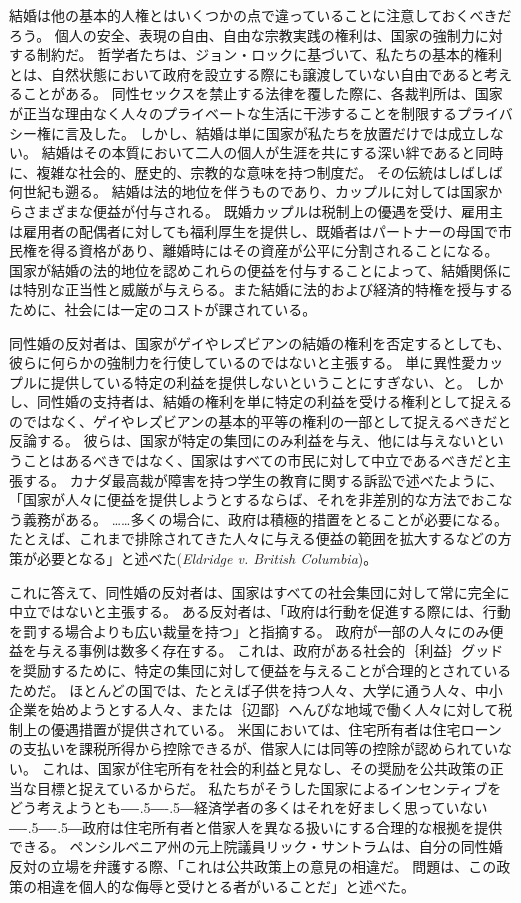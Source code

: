 \documentclass[paper=a4,book,openany]{jlreq}
\def\DDASH{―\kern-.5\zw―\kern-.5\zw―} %
\begin{document}
結婚は他の基本的人権とはいくつかの点で違っていることに注意しておくべきだろう。
個人の安全、表現の自由、自由な宗教実践の権利は、国家の強制力に対する制約だ。
哲学者たちは、ジョン・ロックに基づいて、私たちの基本的権利とは、自然状態において政府を設立する際にも譲渡していない自由であると考えることがある。
同性セックスを禁止する法律を覆した際に、各裁判所は、国家が正当な理由なく人々のプライベートな生活に干渉することを制限するプライバシー権に言及した。
しかし、結婚は単に国家が私たちを放置だけでは成立しない。
結婚はその本質において二人の個人が生涯を共にする深い絆であると同時に、複雑な社会的、歴史的、宗教的な意味を持つ制度だ。
その伝統はしばしば何世紀も遡る。
結婚は法的地位を伴うものであり、カップルに対しては国家からさまざまな便益が付与される。
既婚カップルは税制上の優遇を受け、雇用主は雇用者の配偶者に対しても福利厚生を提供し、既婚者はパートナーの母国で市民権を得る資格があり、離婚時にはその資産が公平に分割されることになる。
国家が結婚の法的地位を認めこれらの便益を付与することによって、結婚関係には特別な正当性と威厳が与えらる。また結婚に法的および経済的特権を授与するために、社会には一定のコストが課されている。

同性婚の反対者は、国家がゲイやレズビアンの結婚の権利を否定するとしても、彼らに何らかの強制力を行使しているのではないと主張する。
単に異性愛カップルに提供している特定の利益を提供しないということにすぎない、と。
しかし、同性婚の支持者は、結婚の権利を単に特定の利益を受ける権利として捉えるのではなく、ゲイやレズビアンの基本的平等の権利の一部として捉えるべきだと反論する。
彼らは、国家が特定の集団にのみ利益を与え、他には与えないということはあるべきではなく、国家はすべての市民に対して中立であるべきだと主張する。
カナダ最高裁が障害を持つ学生の教育に関する訴訟で述べたように、「国家が人々に便益を提供しようとするならば、それを非差別的な方法でおこなう義務がある。
……多くの場合に、政府は積極的措置をとることが必要になる。
たとえば、これまで排除されてきた人々に与える便益の範囲を拡大するなどの方策が必要となる」と述べた(\emph{Eldridge v. British Columbia})。

これに答えて、同性婚の反対者は、国家はすべての社会集団に対して常に完全に中立ではないと主張する。
ある反対者は、「政府は行動を促進する際には、行動を罰する場合よりも広い裁量を持つ」と指摘する\citep[p.607]{dent99:_defen_tradit_marriag}。
政府が一部の人々にのみ便益を与える事例は数多く存在する。
これは、政府がある社会的｛利益｝{グッド}を奨励するために、特定の集団に対して便益を与えることが合理的とされているためだ。
ほとんどの国では、たとえば子供を持つ人々、大学に通う人々、中小企業を始めようとする人々、または｛辺鄙｝{へんぴ}な地域で働く人々に対して税制上の優遇措置が提供されている。
米国においては、住宅所有者は住宅ローンの支払いを課税所得から控除できるが、借家人には同等の控除が認められていない。
これは、国家が住宅所有を社会的利益と見なし、その奨励を公共政策の正当な目標と捉えているからだ。
私たちがそうした国家によるインセンティブをどう考えようとも{\DDASH}経済学者の多くはそれを好ましく思っていない{\DDASH}政府は住宅所有者と借家人を異なる扱いにする合理的な根拠を提供できる。
ペンシルベニア州の元上院議員リック・サントラムは、自分の同性婚反対の立場を弁護する際、「これは公共政策上の意見の相違だ。
問題は、この政策の相違を個人的な侮辱と受けとる者がいることだ」と述べた\citep{villalva12:_gay_activ_rebuk_bully_santor}。
\end{document}
